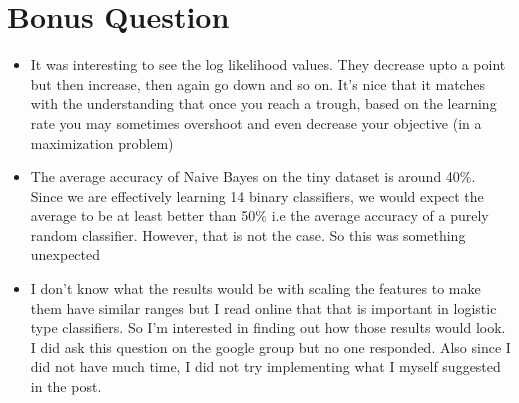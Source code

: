 \documentclass[paper=a4, fontsize=11pt]{scrartcl} %
\numberwithin{equation}{section} %
\numberwithin{figure}{section} %
\numberwithin{table}{section} %
\begin{document}
\section*{\textbf{Bonus Question}}
\begin{itemize} 
\item It was interesting to see the log likelihood values. They decrease upto a point but then increase, then again go down and so on. It's nice that it matches with the understanding that once you reach a trough, based on the learning rate you may sometimes overshoot and even decrease your objective (in a maximization problem)
\item The average accuracy of Naive Bayes on the tiny dataset is around 40\%. Since we are effectively learning 14 binary classifiers, we would expect the average to be at least better than 50\% i.e the average accuracy of a purely random classifier. However, that is not the case. So this was something unexpected
\item I don't know what the results would be with scaling the features to make them have similar ranges but I read online that that is important in logistic type classifiers. So I'm interested in finding out how those results would look. I did ask this question on the google group but no one responded. Also since I did not have much time, I did not try implementing what I myself suggested in the post.
\end{itemize}
\end{document}
